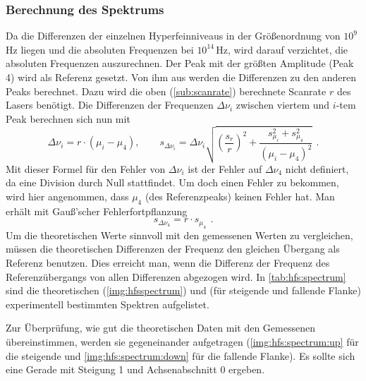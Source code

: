 \subsubsection*{Berechnung des Spektrums}
Da die Differenzen der einzelnen Hyperfeinniveaus in der Größenordnung von $10^9$\,Hz liegen und die absoluten Frequenzen bei $10^{14}$\,Hz, 
wird darauf verzichtet, die absoluten Frequenzen auszurechnen. Der Peak mit der größten Amplitude (Peak 4) wird als Referenz gesetzt. Von ihm aus werden 
die Differenzen zu den anderen Peaks berechnet. Dazu wird die oben (\autoref{sub:scanrate}) berechnete Scanrate $r$ des Lasers benötigt.
Die Differenzen der Frequenzen $\Delta \nu_i$ zwischen viertem und $i$-tem Peak berechnen sich nun mit
\begin{equation}
    \Delta \nu_i = r \cdot \left( \mu_i - \mu_4 \right), 
    \qquad s_{\Delta \nu_i} = \Delta \nu_i \sqrt{ \left( \frac{s_r}{r} \right)^2 + \frac{s_{\mu_i}^2 + s_{\mu_4}^2}{ \left( \mu_i - \mu_4 \right)^2 }} \ \, .
\end{equation}
Mit dieser Formel für den Fehler von $\Delta \nu_i$ ist der Fehler auf $\Delta \nu_4$ nicht definiert, da eine Division durch Null stattfindet.
Um doch einen Fehler zu bekommen, wird hier angenommen, dass $\mu_4$ (des Referenzpeaks) keinen Fehler hat. Man erhält mit Gauß'scher Fehlerfortpflanzung
\begin{equation}
    s_{\Delta \nu_4} = r \cdot s_{\mu_4} \ \, .
\end{equation}
Um die theoretischen Werte sinnvoll mit den gemessenen Werten zu vergleichen, müssen die theoretischen Differenzen der Frequenz den gleichen 
Übergang als Referenz benutzen. Dies erreicht man, wenn die Differenz der Frequenz des Referenzübergangs von allen Differenzen abgezogen wird.
In \autoref{tab:hfs:spectrum} sind die theoretischen (\autoref{img:hfsspectrum}) und (für steigende und fallende Flanke) experimentell bestimmten Spektren aufgelistet.   

Zur Überprüfung, wie gut die theoretischen Daten mit den Gemessenen übereinstimmen, werden sie gegeneinander aufgetragen 
(\autoref{img:hfs:spectrum:up} für die steigende und \autoref{img:hfs:spectrum:down} für die fallende Flanke). Es sollte sich 
eine Gerade mit Steigung 1 und Achsenabschnitt 0 ergeben.

